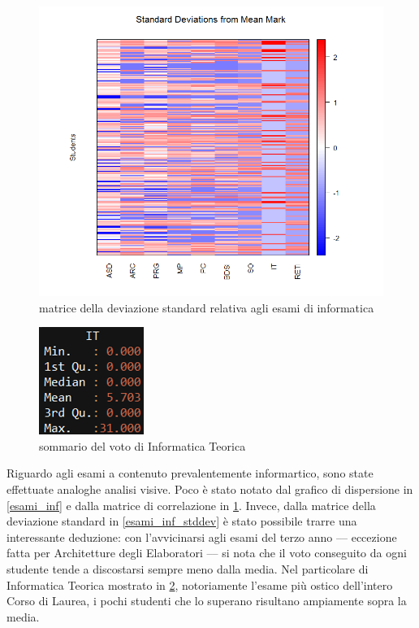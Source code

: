 \begin{figure}
    \centering
    \caption{matrice della deviazione standard relativa agli esami di informatica}
    \label{esami_inf_corr}
	\includegraphics[scale=0.32]{img/std_dev_matrix_2.png}
\end{figure}

\begin{figure}
    \centering
    \caption{sommario del voto di Informatica Teorica}
    \label{it}
	\includegraphics[scale=0.8]{img/it.png}
\end{figure}

Riguardo agli esami a contenuto prevalentemente informartico, sono state effettuate analoghe analisi visive. Poco è stato notato dal grafico di dispersione in \ref{esami_inf} e dalla matrice di correlazione in \ref{esami_inf_corr}. Invece, dalla matrice della deviazione standard in \ref{esami_inf_stddev} è stato possibile trarre una interessante deduzione: con l’avvicinarsi agli esami del terzo anno –-- eccezione fatta per Architetture degli Elaboratori –-- si nota che il voto conseguito da ogni studente tende a discostarsi sempre meno dalla media. Nel particolare di Informatica Teorica mostrato in \ref{it}, notoriamente l'esame più ostico dell'intero Corso di Laurea, i pochi studenti che lo superano risultano ampiamente sopra la media. \\

